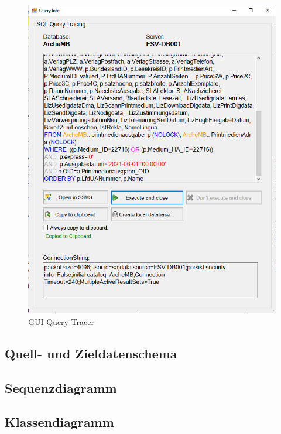 \documentclass[11pt,toc=sectionentrywithoutdots, 
headheight=44pt, headings=optiontoheadandtoc, hyperfootnotes=false, hypertexnames=false]{scrartcl}
\begin{document}
 \begin{figure}[H]
 \centering

	\includegraphics[scale=0.9]{gui.png}
	 \caption{GUI Query-Tracer}
 \end{figure}
 \clearpage
 
 
   
  
 

\subsection{Quell- und Zieldatenschema}
\blindtext\blindtext

\subsection{Sequenzdiagramm}
\blindtext


\subsection{Klassendiagramm}
\end{document}
